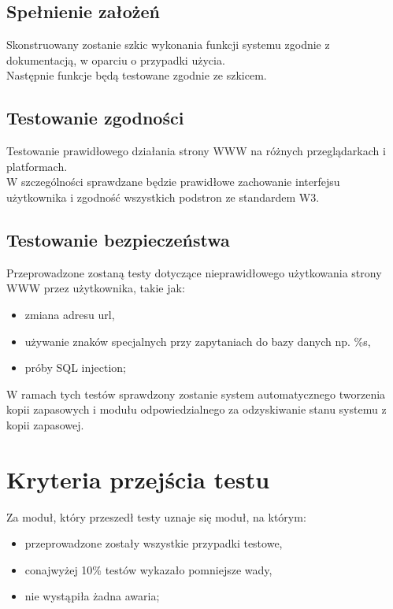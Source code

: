 \documentclass[11pt,a4paper]{article}
\begin{document}
	\subsection{Spełnienie założeń}

	Skonstruowany zostanie szkic wykonania funkcji systemu zgodnie 
	z dokumentacją, w oparciu o przypadki użycia.\\
	Następnie funkcje będą testowane zgodnie ze szkicem.

	\subsection{Testowanie zgodności}

	Testowanie prawidłowego działania strony WWW na różnych przeglądarkach i platformach.\\
	 W szczególności sprawdzane będzie prawidłowe zachowanie
	interfejsu użytkownika i zgodność wszystkich podstron ze standardem W3.

	\subsection{Testowanie bezpieczeństwa}

	Przeprowadzone zostaną testy dotyczące nieprawidłowego użytkowania strony WWW przez użytkownika, takie jak:
		\begin{itemize}

			\item	 zmiana adresu url, 
			\item używanie znaków specjalnych przy zapytaniach
				do bazy danych np. \%s, 
			\item  próby SQL injection; 
		\end{itemize}
	W ramach tych testów sprawdzony zostanie system automatycznego tworzenia kopii zapasowych i modułu odpowiedzialnego za odzyskiwanie stanu systemu z kopii zapasowej.\\

\section{Kryteria przejścia testu}
	Za moduł, który przeszedł testy uznaje się moduł, na którym:
		\begin{itemize}
			\item przeprowadzone zostały wszystkie przypadki testowe,
			\item conajwyżej 10\% testów wykazało pomniejsze wady, %
			\item nie wystąpiła żadna awaria;				%
		\end{itemize}
\end{document}

